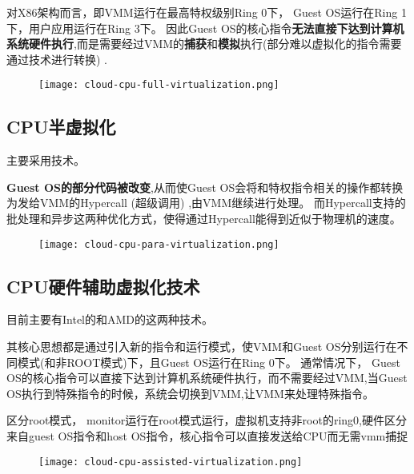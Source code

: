 对X86架构而言，即VMM运行在最高特权级别Ring 0下， Guest OS运行在Ring 1下，用户应用运行在Ring 3下。 因此Guest OS的核心指令\textbf{无法直接下达到计算机系统硬件执行},而是需要经过VMM的\textbf{捕获}和\textbf{模拟}执行(部分难以虚拟化的指令需要通过技术进行转换) . 

\begin{figure}[htbp]
    \begin{center}
        \texttt{[image: cloud-cpu-full-virtualization.png]}
    \end{center}
\end{figure}

\subsection{CPU半虚拟化}
    
主要采用技术。 

\textbf{Guest OS的部分代码被改变},从而使Guest OS会将和特权指令相关的操作都转换为发给VMM的Hypercall (超级调用) ,由VMM继续进行处理。 而Hypercall支持的批处理和异步这两种优化方式，使得通过Hypercall能得到近似于物理机的速度。 

\begin{figure}[htbp]
    \begin{center}
        \texttt{[image: cloud-cpu-para-virtualization.png]}
    \end{center}
\end{figure}

\subsection{CPU硬件辅助虚拟化技术}

目前主要有Intel的和AMD的这两种技术。 

其核心思想都是通过引入新的指令和运行模式，使VMM和Guest OS分别运行在不同模式(和非ROOT模式)下，且Guest OS运行在Ring 0下。 通常情况下， Guest OS的核心指令可以直接下达到计算机系统硬件执行，而不需要经过VMM,当Guest OS执行到特殊指令的时候，系统会切换到VMM,让VMM来处理特殊指令。 

区分root模式， monitor运行在root模式运行，虚拟机支持非root的ring0,硬件区分来自guest OS指令和host OS指令，核心指令可以直接发送给CPU而无需vmm捕捉

\begin{figure}[htbp]
    \begin{center}
        \texttt{[image: cloud-cpu-assisted-virtualization.png]}
    \end{center}
\end{figure}

